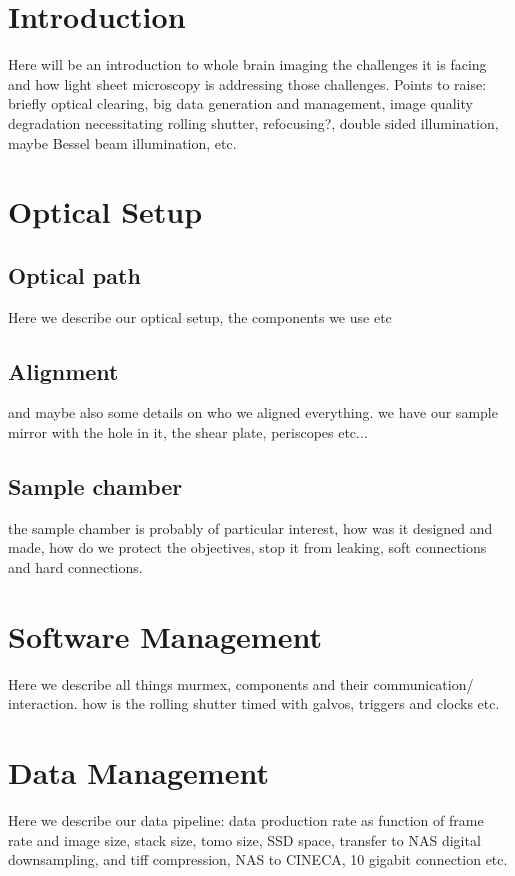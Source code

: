 \documentclass[12pt]{spieman}  %
\begin{document}
\begin{spacing}{2}   %

\section{Introduction}
\label{sect:intro}  %
Here will be an introduction to whole brain imaging the challenges it is facing and how light sheet microscopy is addressing those challenges. Points to raise: briefly optical clearing, big data generation and management, image quality degradation necessitating rolling shutter, refocusing?, double sided illumination, maybe Bessel beam illumination, etc. 

\section{Optical Setup}
\subsection{Optical path}
Here we describe our optical setup, the components we use etc

\subsection{Alignment}
and maybe also some details on who we aligned everything. we have our sample mirror with the hole in it, the shear plate, periscopes etc...

\subsection{Sample chamber}
the sample chamber is probably of particular interest, how was it designed and made, how do we protect the objectives, stop it from leaking, soft connections and hard connections. 


\section{Software Management}
Here we describe all things murmex, components and their communication/ interaction. how is the rolling shutter timed with galvos, triggers and clocks etc. 

\section{Data Management}
Here we describe our data pipeline: data production rate as function of frame rate and image size, stack size, tomo size, SSD space, transfer to NAS digital downsampling, and tiff compression, NAS to CINECA, 10 gigabit connection etc.


\end{spacing}
\end{document}
